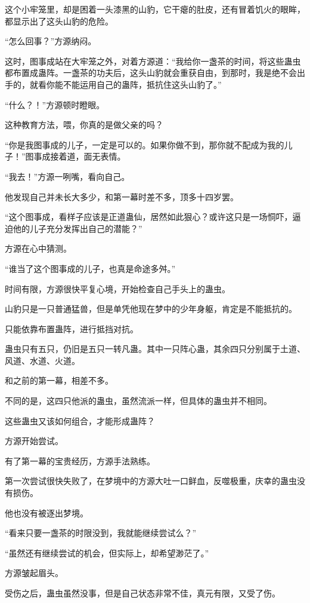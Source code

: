 \begin{this_body}
这个小牢笼里，却是困着一头漆黑的山豹，它干瘪的肚皮，还有冒着饥火的眼眸，都显示出了这头山豹的危险。

“怎么回事？”方源纳闷。

这时，图事成站在大牢笼之外，对着方源道：“我给你一盏茶的时间，将这些蛊虫都布置成蛊阵。一盏茶的功夫后，这头山豹就会重获自由，到那时，我是绝不会出手的，就看你能不能运用自己的蛊阵，抵抗住这头山豹了。”

“什么？！”方源顿时瞪眼。

这种教育方法，喂，你真的是做父亲的吗？

“你是我图事成的儿子，一定是可以的。如果你做不到，那你就不配成为我的儿子！”图事成接着道，面无表情。

“我去！”方源一咧嘴，看向自己。

他发现自己并未长大多少，和第一幕时差不多，顶多十四岁罢。

“这个图事成，看样子应该是正道蛊仙，居然如此狠心？或许这只是一场恫吓，逼迫他的儿子充分发挥出自己的潜能？”

方源在心中猜测。

“谁当了这个图事成的儿子，也真是命途多舛。”

时间有限，方源很快平复心境，开始检查自己手头上的蛊虫。

山豹只是一只普通猛兽，但是单凭他现在梦中的少年身躯，肯定是不能抵抗的。

只能依靠布置蛊阵，进行抵挡对抗。

蛊虫只有五只，仍旧是五只一转凡蛊。其中一只阵心蛊，其余四只分别属于土道、风道、水道、火道。

和之前的第一幕，相差不多。

不同的是，这四只他派的蛊虫，虽然流派一样，但具体的蛊虫并不相同。

这些蛊虫又该如何组合，才能形成蛊阵？

方源开始尝试。

有了第一幕的宝贵经历，方源手法熟练。

第一次尝试很快失败了，在梦境中的方源大吐一口鲜血，反噬极重，庆幸的蛊虫没有损伤。

他也没有被逐出梦境。

“看来只要一盏茶的时限没到，我就能继续尝试么？”

“虽然还有继续尝试的机会，但实际上，却希望渺茫了。”

方源皱起眉头。

受伤之后，蛊虫虽然没事，但是自己状态非常不佳，真元有限，又受了伤。


\end{this_body}

